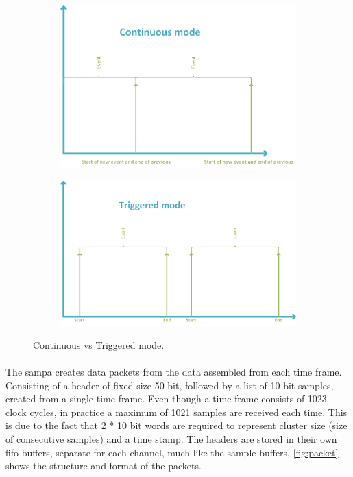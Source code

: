 \documentclass[a4paper, 12pt]{report}
\begin{document}
\begin{figure}[t!]
	\centering
		\begin{subfigure}[]{0.9\textwidth}
			\label{fig:cont}
			\includegraphics[width=\textwidth]{images/cont-mode.png}
		\end{subfigure}
		\begin{subfigure}[]{0.9\textwidth}
			\label{fig:trig}
			\includegraphics[width=\textwidth]{images/triggered-mode.png}
		\end{subfigure}
	\caption{Continuous vs Triggered mode.}
	\label{fig:cont-vs-trig}
\end{figure}

\paragraph{}
The \gls{sampa} creates data packets from the data assembled from each time frame.
Consisting of a header of fixed size 50 bit, followed by a list of 10 bit samples, created from a single time frame.
Even though a time frame consists of 1023 clock cycles, in practice a maximum of 1021 samples are received each time.
This is due to the fact that 2 * 10 bit words are required to represent cluster size (size of consecutive samples) and a time stamp.
The headers are stored in their own \gls{fifo} buffers, separate for each channel, much like the sample buffers.
\ref{fig:packet} shows the structure and format of the packets.
\end{document}
